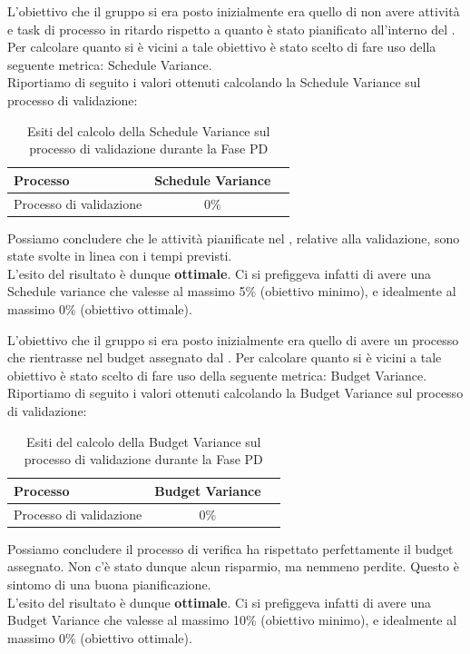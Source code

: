 				L'obiettivo che il gruppo si era posto inizialmente era quello di non avere attività e task di processo in ritardo rispetto a quanto è stato pianificato all'interno del . Per calcolare quanto si è vicini a tale obiettivo è stato scelto di fare uso della seguente metrica: Schedule Variance.\\
				Riportiamo di seguito i valori ottenuti calcolando la Schedule Variance sul processo di validazione:
				\begin{table}[H]
					\centering
					\begin{tabu}{| l | c | c |}
						\hline
						Processo 			      & Schedule Variance   \\ \hline \hline
						Processo di validazione   & 0\%                 \\ \hline
					\end{tabu}
					\caption{Esiti del calcolo della Schedule Variance sul processo di validazione durante la Fase PD}
				\end{table}
				Possiamo concludere che le attività pianificate nel , relative alla validazione, sono state svolte in linea con i tempi previsti.\\
				L'esito del risultato è dunque \textbf{ottimale}. Ci si prefiggeva infatti di avere una Schedule variance che valesse al massimo 5\% (obiettivo minimo), e idealmente al massimo 0\% (obiettivo ottimale).
						
				L'obiettivo che il gruppo si era posto inizialmente era quello di avere un processo che rientrasse nel budget assegnato dal . Per calcolare quanto si è vicini a tale obiettivo è stato scelto di fare uso della seguente metrica: Budget Variance.\\
				Riportiamo di seguito i valori ottenuti calcolando la Budget Variance sul processo di validazione:
				\begin{table}[H]
					\centering
					\begin{tabu}{| l | c | c |}
						\hline
						Processo 			      & Budget Variance     \\ \hline \hline
						Processo di validazione   & 0\%                 \\ \hline
					\end{tabu}
					\caption{Esiti del calcolo della Budget Variance sul processo di validazione durante la Fase PD}
				\end{table}
				Possiamo concludere il processo di verifica ha rispettato perfettamente il budget assegnato. Non c'è stato dunque alcun risparmio, ma nemmeno perdite. Questo è sintomo di una buona pianificazione.\\
				L'esito del risultato è dunque \textbf{ottimale}. Ci si prefiggeva infatti di avere una Budget Variance che valesse al massimo 10\% (obiettivo minimo), e idealmente al massimo 0\% (obiettivo ottimale).
							
